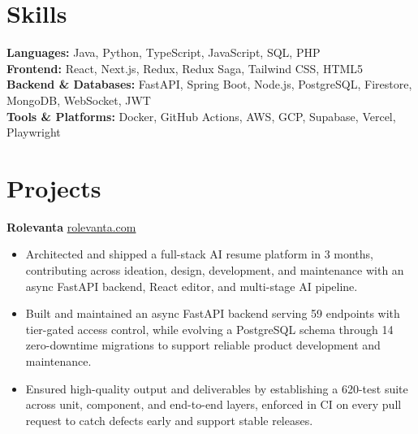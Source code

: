 \documentclass[11pt]{article}       %
\begin{document}
\vspace{-10.5pt}

\section*{Skills}
\textbf{Languages:} Java, Python, TypeScript, JavaScript, SQL, PHP \\
\textbf{Frontend:} React, Next.js, Redux, Redux Saga, Tailwind CSS, HTML5 \\
\textbf{Backend \& Databases:} FastAPI, Spring Boot, Node.js, PostgreSQL, Firestore, MongoDB, WebSocket, JWT \\
\textbf{Tools \& Platforms:} Docker, GitHub Actions, AWS, GCP, Supabase, Vercel, Playwright
\vspace{-5pt}






\section*{Projects}
\textbf{Rolevanta} \hfill \href{https://rolevanta.com}{rolevanta.com} \\
\vspace{-9pt}
\begin{itemize}
  \item Architected and shipped a full-stack AI resume platform in 3 months, contributing across ideation, design, development, and maintenance with an async FastAPI backend, React editor, and multi-stage AI pipeline.
  \item Built and maintained an async FastAPI backend serving 59 endpoints with tier-gated access control, while evolving a PostgreSQL schema through 14 zero-downtime migrations to support reliable product development and maintenance.
  \item Ensured high-quality output and deliverables by establishing a 620-test suite across unit, component, and end-to-end layers, enforced in CI on every pull request to catch defects early and support stable releases.
\end{itemize}
\end{document}

